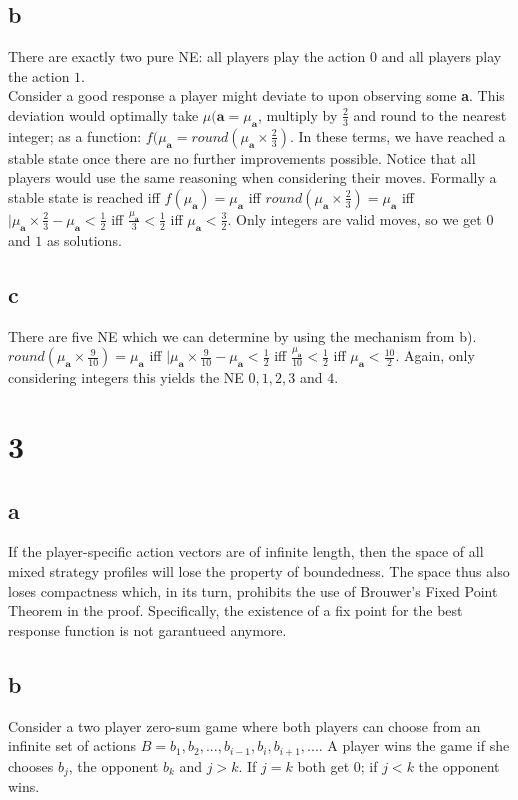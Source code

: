 \documentclass[10pt,a4paper]{article}
\begin{document}
\subsection*{b}
There are exactly two pure NE: all players play the action $0$ and all players play the action $1$.\\
Consider a good response a player might deviate to upon observing some \textbf{a}. This deviation would optimally take $\mu(\textbf{a}=\mu_{\textbf{a}}$, multiply by $\tfrac{2}{3}$ and round to the nearest integer; as a function: $f(\mu_{\textbf{a}}=round(\mu_{\textbf{a}}\times \tfrac{2}{3})$. In these terms, we have reached a stable state once there are no further improvements possible. Notice that all players would use the same reasoning when considering their moves. Formally a stable state is reached iff $f(\mu_{\textbf{a}})=\mu_{\textbf{a}}$ iff $round(\mu_{\textbf{a}}\times \tfrac{2}{3})=\mu_{\textbf{a}}$ iff $|\mu_{\textbf{a}}\times \tfrac{2}{3}-\mu_{\textbf{a}} < \tfrac{1}{2}$ iff $\tfrac{\mu_{\textbf{a}}}{3} < \tfrac{1}{2}$ iff $\mu_{\textbf{a}} < \tfrac{3}{2}$. Only integers are valid moves, so we get $0$ and $1$ as solutions.
\subsection*{c}
There are five NE which we can determine by using the mechanism from b). $round(\mu_{\textbf{a}}\times \tfrac{9}{10})=\mu_{\textbf{a}}$ iff $|\mu_{\textbf{a}}\times \tfrac{9}{10}-\mu_{\textbf{a}} < \tfrac{1}{2}$ iff $\tfrac{\mu_{\textbf{a}}}{10} < \tfrac{1}{2}$ iff $\mu_{\textbf{a}} < \tfrac{10}{2}$. Again, only considering integers this yields the NE $0,1,2,3$ and $4$.
\section*{3}
\subsection*{a}
If the player-specific action vectors are of infinite length, then the space of all mixed strategy profiles will lose the property of boundedness. The space thus also loses compactness which, in its turn, prohibits the use of Brouwer's Fixed Point Theorem in the proof. Specifically, the existence of a fix point for the best response function is not garantueed anymore.
\subsection*{b}
Consider a two player zero-sum game where both players can choose from an infinite set of actions $B={b_1,b_2,...,b_{i-1},b_i,b_{i+1},...}$. A player wins the game if she chooses $b_j$, the opponent $b_k$ and $j>k$. If $j=k$ both get $0$; if $j<k$ the opponent wins. 
\end{document}
